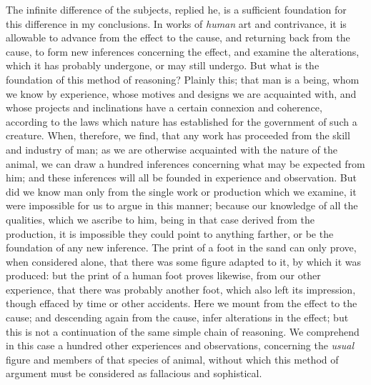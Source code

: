 \documentclass[]{article}
\begin{document}
\begin{sectionbody}
\humeparagraph  The infinite difference of the subjects, replied he, is a sufficient foundation for this difference in my conclusions. In works of \emph{human} art and contrivance, it is allowable to advance from the effect to the cause, and returning back from the cause, to form new inferences concerning the effect, and examine the alterations, which it has probably undergone, or may still undergo. But what is the foundation of this method of reasoning? Plainly this; that man is a being, whom we know by experience, whose motives and designs we are acquainted with, and whose projects and inclinations have a certain connexion and coherence, according to the laws which nature has established for the government of such a creature. When, therefore, we find, that any work has proceeded from the skill and industry of man; as we are otherwise acquainted with the nature of the animal, we can draw a hundred inferences concerning what may be expected from him; and these inferences will all be founded in experience and observation. But did we know man only from the single work or production which we examine, it were impossible for us to argue in this manner; because our knowledge of all the qualities, which we ascribe to him, being in that case derived from the production, it is impossible they could point to anything farther, or be the foundation of any new inference. The print of a foot in the sand can only prove, when considered alone, that there was some figure adapted to it, by which it was produced: but the print of a human foot proves likewise, from our other experience, that there was probably another foot, which also left its impression, though effaced by time or other accidents. Here we mount from the effect to the cause; and descending again from the cause, infer alterations in the effect; but this is not a continuation of the same simple chain of reasoning. We comprehend in this case a hundred other experiences and observations, concerning the \emph{usual} figure and members of that species of animal, without which this method of argument must be considered as fallacious and sophistical.


\end{sectionbody}
\end{document}
